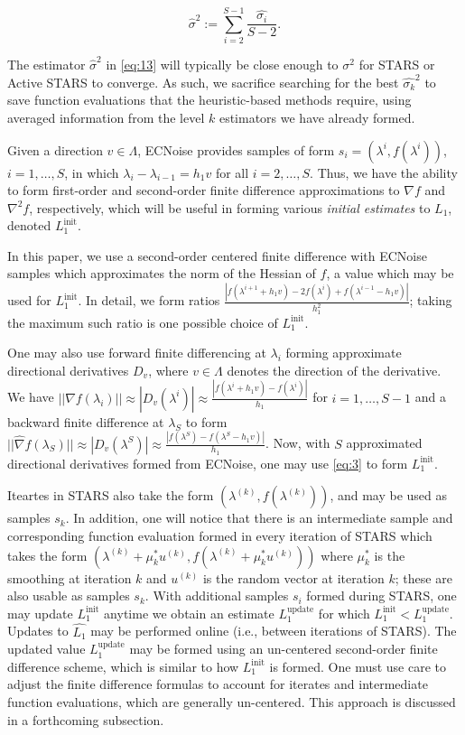 \documentclass{amsart}
\begin{document}
\begin{equation} \label{eq:15}
 \hat{\sigma}^2:=\sum_{i=2}^{S-1}\frac{\hat{\sigma_i}}{S-2}.
\end{equation}  

The estimator $\hat{\sigma}^2$ in \eqref{eq:13} will typically be close enough to $\sigma^2$ for STARS or Active STARS to converge. As such, we sacrifice searching for the best $\hat{\sigma_k}^2$ to save function evaluations that the heuristic-based methods require, using averaged information from the level $k$ estimators we have already formed.

Given a direction $v \in \Lambda$, ECNoise provides samples of form $s_i=(\lambda^i, f(\lambda^i))$, $i=1,\ldots, S$, in which $\lambda_i-\lambda_{i-1}=h_1v$ for all $i=2,\ldots, S.$ Thus, we have the ability to form first-order and second-order finite difference approximations to $\nabla f$ and $\nabla^2 f$, respectively, which will be useful in forming various \textit{initial estimates} to $L_1$, denoted $L_1^\text{init}$. 

In this paper, we use a second-order centered finite difference with ECNoise samples which approximates the norm of the Hessian of $f$, a value which may be used for $L_1^\text{init}$. In detail, we form ratios $\frac{|f(\lambda^{i+1}+h_1 v)-2f(\lambda^{i})+f(\lambda^{i-1}-h_1 v)|}{h_1^2}$; taking the maximum such ratio is one possible choice of $L_1^\text{init}$.

One may also use forward finite differencing at $\lambda_i$ forming approximate directional derivatives $D_v$, where $v \in \Lambda$ denotes the direction of the derivative.  We have $||\hat{\nabla }f(\lambda_i)||\approx |D_v (\lambda^i)|\approx\frac{|f(\lambda^{i}+h_1 v)-f(\lambda^{i})|}{h_1}$ for $i=1,\ldots,S-1$ and a backward finite difference at $\lambda_S$ to form $||\hat{\nabla }f(\lambda_S)|| \approx |D_v(\lambda^S)|\approx\frac{|f(\lambda^{S})-f(\lambda^{S}-h_1 v)|}{h_1}$. Now, with $S$ approximated directional derivatives formed from ECNoise, one may use \eqref{eq:3} to form $L_1^\text{init}$.

Iteartes in STARS also take the form $(\lambda^{(k)}, f(\lambda^{(k)}))$, and may be used as samples $s_k$. In addition, one will notice that there is an intermediate sample and corresponding function evaluation formed in every iteration of STARS which takes the form $(\lambda^{(k)}+\mu^*_k u^{(k)}, f(\lambda^{(k)}+\mu^*_k u^{(k)}))$ where $\mu^*_k$ is the smoothing at iteration $k$ and $u^{(k)}$ is the random vector at iteration $k$; these are also usable as samples $s_k$. With additional samples $s_i$ formed during STARS, one may update $L_1^\text{init}$ anytime we obtain an estimate $L_1^\text{update}$ for which $L_1^\text{init}<L_1^\text{update}$. Updates to $\hat{L_1}$ may be performed online (i.e., between iterations of STARS). The updated value $L_1^\text{update}$ may be formed using an un-centered second-order finite difference scheme, which is similar to how $L_1^\text{init}$ is formed. One must use care to adjust the finite difference formulas to account for iterates and intermediate function evaluations, which are generally un-centered. This approach is discussed in a forthcoming subsection.
\end{document}
